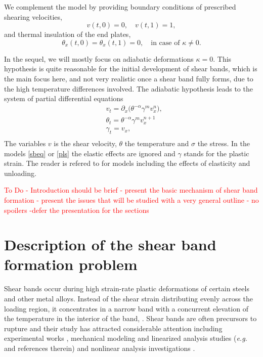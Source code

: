 \documentclass[a4paper,11pt]{article}
\newcommand{\del}{\partial}
\newcommand{\tcr}{\textcolor{red}}
\theoremstyle{remark}
\begin{document}
We complement the model by providing boundary conditions of prescribed shearing velocities,
\begin{equation} \label{BCOND1}
 v(t,0)=0, \quad v(t,1)=1,
\end{equation}
and thermal insulation of the end plates,
\begin{equation} \label{BCOND2}
 \theta_x(t,0)=\theta_x(t,1)=0, \quad \text{in case of $\kappa\ne0$.}
\end{equation}



In the sequel, we will mostly focus on adiabatic deformations $\kappa = 0$. This hypothesis is quite reasonable for the initial development of shear bands,
which is the main focus here, and not very realistic once a shear band fully forms, due to the high temperature differences involved.
The adiabatic hypothesis leads to the system of partial differential equations
\begin{equation}
  \label{pls}
  \begin{aligned}
    & v_{t} = \del_x \Big ( \theta^{-\alpha}\gamma^{m}  v_{x}^n \Big )  ,\\
    & \theta_{t} =  \theta^{-\alpha}\gamma^{m} v_{x}^{n+1}   \\
    & \gamma_{t} = v_{x},  \\
  \end{aligned}
\end{equation}
The variables $v$ is the shear velocity, $\theta$ the temperature and $\sigma$ the stress.
In the models \eqref{sbeq} or \eqref{pls} the elastic effects are ignored and $\gamma$ stands for the plastic strain. The reader is refered to
\cite{SC89} for models including the effects of elasticity and unloading.


\tcr{To Do -  Introduction should be brief - present the basic mechanism of shear band formation - present the issues that
will be studied with a very general outline - no spoilers -defer the presentation for the sections }



\vfil\eject


 \section{Description of the shear band formation problem}
\label{mathmodel}

Shear bands occur during
high strain-rate plastic deformations of certain steels and other metal alloys. Instead of the shear strain distributing evenly across the loading region,
it concentrates in a narrow band with a concurrent elevation of the temperature in the interior of the band, \cite{ZH44,HDH87}.
Shear bands are often precursors to rupture and their study has attracted considerable
attention including  experimental works  \cite{CCHD79,HDH87}, mechanical modeling
and  linearized analysis studies  ({\it e.g.} \cite{CDHS84,FM87,MC87,SC89,Wright02} and references therein) and
nonlinear analysis investigations  \cite{DH83,Tzavaras87,BPV91}.
\end{document}
